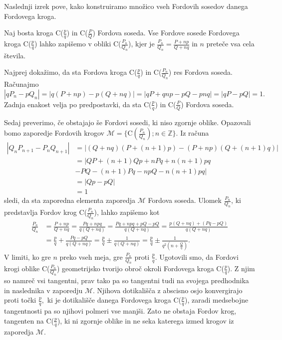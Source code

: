 \documentclass[mat1]{fmfdelo}
\newcommand{\Z}{\mathbb Z}
\begin{document}
Naslednji izrek pove, kako konstruiramo množico vseh Fordovih sosedov danega Fordovega kroga.

\begin{izrek}
Naj bosta kroga C($\frac{p}{q}$) in C($\frac{P}{Q}$) Fordova soseda. Vse Fordove sosede Fordovega kroga C($\frac{p}{q}$) lahko zapišemo v obliki C($\frac{P_n}{Q_n}$), kjer je $\frac{P_n}{Q_n} = \frac{P+np}{Q+nq}$ in $n$ preteče vsa cela števila.
\end{izrek}

\begin{dokaz}
%
Najprej dokažimo, da sta Fordova kroga C($\frac{p}{q}$) in C($\frac{P_n}{Q_n}$) res Fordova soseda. Računajmo
\[ |qP_{n} - pQ_{n}| = |q(P+np) - p(Q+nq)| = |qP+qnp-pQ-pnq| = |qP-pQ| = 1. \]
Zadnja enakost velja po predpostavki, da sta C($\frac{p}{q}$) in C($\frac{P}{Q}$) Fordova soseda.

Sedaj preverimo, če obstajajo še Fordovi sosedi, ki niso zgornje oblike. Opazovali bomo zaporedje Fordovih krogov $\mathcal{M} = \{ \mathrm{C}(\frac{P_n}{Q_n}); n\in\Z \}.$
Iz računa
\begin{align*}
|Q_{n}P_{n+1} - P_{n}Q_{n+1}| 
  &= |(Q+nq)(P+(n+1)p) - (P+np)(Q+(n+1)q)| \\ 
  &= |QP + (n+1)Qp + nPq + n(n+1)pq \\
  &   - PQ - (n+1)Pq - npQ - n(n+1)pq| \\
  &= |Qp - pQ| \\
  &= 1
\end{align*}
sledi, da sta zaporedna elementa zaporedja $\mathcal{M}$ Fordova soseda. Ulomek $\frac{P_n}{Q_n}$, ki predstavlja Fordov krog C($\frac{P_n}{Q_n}$), lahko zapišemo kot
\begin{align*}
\frac{P_n}{Q_n}
  &= \frac{P+np}{Q+nq} = \frac{Pq+npq}{q(Q+nq)} = \frac{Pq+npq+pQ-pQ}{q(Q+nq)} = \frac{p(Q+nq) + (Pq-pQ)}{q(Q+nq)} \\
  &= \frac{p}{q} + \frac{Pq-pQ}{q(Q+nq)} = \frac{p}{q} \pm \frac{1}{q(Q+nq)} = \frac{p}{q} \pm \frac{1}{q^2 \left (n+\frac{Q}{q} \right)}.
\end{align*}
V limiti, ko gre $n$ preko vseh meja, gre $\frac{P_n}{Q_n}$ proti $\frac{p}{q}.$
Ugotovili smo, da Fordovi krogi oblike C($\frac{P_n}{Q_n}$) geometrijsko tvorijo obroč okroli Fordovega kroga C($\frac{p}{q}$). Z njim so namreč vsi tangentni, prav tako pa so tangentni tudi na svojega predhodnika in naslednika v zaporedju $\mathcal{M}$. Njihova dotikališča z abscisno osjo konvergirajo proti točki $\frac{p}{q},$ ki je dotikališče danega Fordovega kroga C($\frac{p}{q}$), zaradi medsebojne tangentnosti pa so njihovi polmeri vse manjši. Zato ne obstaja Fordov krog, tangenten na C($\frac{p}{q}$), ki ni zgornje oblike in ne seka katerega izmed krogov iz zaporedja $\mathcal{M}$.
%
\end{dokaz}
\end{document}
